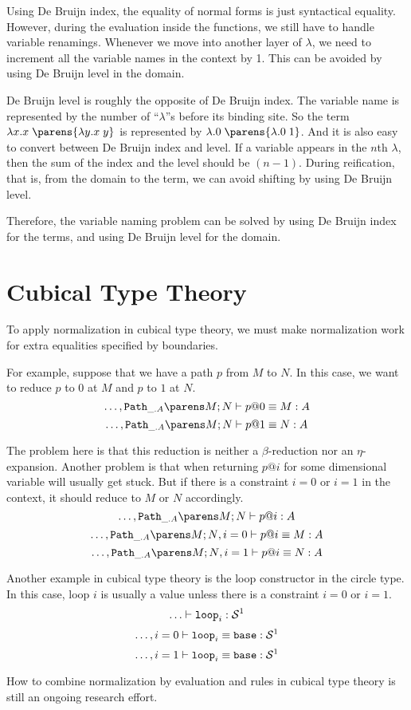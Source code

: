 \documentclass[11pt]{article}
\begin{document}
Using De Bruijn index, the equality of normal forms is just syntactical equality. However, during the evaluation inside the functions, we still have to handle variable renamings. Whenever we move into another layer of $\lambda$, we need to increment all the variable names in the context by 1. This can be avoided by using De Bruijn level in the domain.

De Bruijn level is roughly the opposite of De Bruijn index. The variable name is represented by the number of ``$\lambda$''s before its binding site. So the term $\lam{x}{\app{x}{\parens{\lam{y}{\app{x}{y}}}}}$ is represented by $\lam{}{\app{0}{\parens{\lam{}{\app{0}{1}}}}}$. And it is also easy to convert between De Bruijn index and level. If a variable appears in the $n$th $\lambda$, then the sum of the index and the level should be $(n-1)$. During reification, that is, from the domain to the term, we can avoid shifting by using De Bruijn level.

Therefore, the variable naming problem can be solved by using De Bruijn index for the terms, and using De Bruijn level for the domain.

\section{Cubical Type Theory}
To apply normalization in cubical type theory, we must make normalization work for extra equalities specified by boundaries.

For example, suppose that we have a path $p$ from $M$ to $N$. In this case, we want to reduce $p$ to $0$ at $M$ and $p$ to $1$ at $N$.
\[
  \eqterm{\hdots, \pathtype{\_}{A}{M}{N}}{p@0}{M}{A}
\]
\[
  \eqterm{\hdots, \pathtype{\_}{A}{M}{N}}{p@1}{N}{A}
\]

The problem here is that this reduction is neither a $\beta$-reduction nor an $\eta$-expansion. Another problem is that when returning $p@i$ for some dimensional variable will usually get stuck. But if there is a constraint $i=0$ or $i=1$ in the context, it should reduce to $M$ or $N$ accordingly.
\[
\oftype{\hdots, \pathtype{\_}{A}{M}{N}}{p@i}{A}
\]
\[
\eqterm{\hdots, \pathtype{\_}{A}{M}{N}, i=0}{p@i}{M}{A}
\]
\[
\eqterm{\hdots, \pathtype{\_}{A}{M}{N}, i=1}{p@i}{N}{A}
\]

Another example in cubical type theory is the loop constructor in the circle type. In this case, loop $i$ is usually a value unless there is a constraint $i=0$ or $i=1$.
\[
\oftype{\hdots}{\sphereloop_i}{\spheretype{1}}
\]
\[
\eqterm{\hdots, i=0}{\sphereloop_i}{\spherebase}{\spheretype{1}}
\]
\[
\eqterm{\hdots, i=1}{\sphereloop_i}{\spherebase}{\spheretype{1}}
\]

How to combine normalization by evaluation and rules in cubical type theory is still an ongoing research effort.
\end{document}
